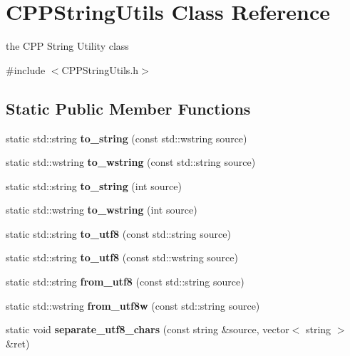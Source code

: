 \section{CPPStringUtils Class Reference}
\label{classCPPStringUtils}


the CPP String Utility class  


{\ttfamily \#include $<$CPPStringUtils.h$>$}\subsection*{Static Public Member Functions}
\begin{DoxyCompactItemize}
\item 
static std::string {\bfseries to\_\-string} (const std::wstring source)\label{classCPPStringUtils_af9c18bef8a105cf0082b3f6cc4c84a51}

\item 
static std::wstring {\bfseries to\_\-wstring} (const std::string source)\label{classCPPStringUtils_a92b4384044e71a93cd1f4a521b68f9e8}

\item 
static std::string {\bfseries to\_\-string} (int source)\label{classCPPStringUtils_a65fa7689b204cd5a60e10619168036a7}

\item 
static std::wstring {\bfseries to\_\-wstring} (int source)\label{classCPPStringUtils_a940c65dda5f8798ae6e7ce5927f16558}

\item 
static std::string {\bfseries to\_\-utf8} (const std::string source)\label{classCPPStringUtils_afa13ebc9f5a56289d7e985cb8f7ccc48}

\item 
static std::string {\bfseries to\_\-utf8} (const std::wstring source)\label{classCPPStringUtils_a4d61f2e6897ebfb46b409f66cfaf2cc9}

\item 
static std::string {\bfseries from\_\-utf8} (const std::string source)\label{classCPPStringUtils_a11efd28c277a70fa279ceb14e930af96}

\item 
static std::wstring {\bfseries from\_\-utf8w} (const std::string source)\label{classCPPStringUtils_ae03a71420a0600ee0e58196456fe681e}

\item 
static void {\bfseries separate\_\-utf8\_\-chars} (const string \&source, vector$<$ string $>$ \&ret)\label{classCPPStringUtils_a0828fbcabd983d1bd66fb9ebd7a1dd50}


\end{DoxyCompactItemize}

